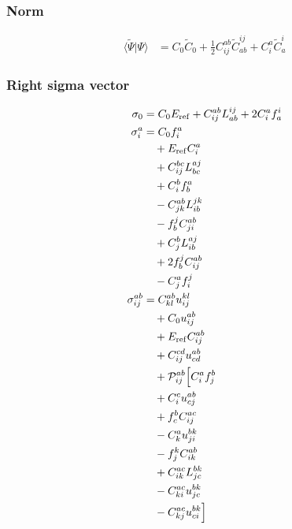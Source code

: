 
\subsubsection{Norm}
\begin{align*}
\langle\widetilde{\Psi}\vert\Psi\rangle &= C_{0} \widetilde{C}_{0}   + \frac{1}{2} C^{ab}_{ij}  \widetilde{C}^{ij}_{ab}   + C^{a}_{i}  \widetilde{C}^{i}_{a}
\end{align*}

\subsubsection{Right sigma vector}
\begin{align*}
\sigma_{0} &= C_{0} E_{\mathrm{ref}}   + C^{ab}_{ij}  L^{ij}_{ab}   + 2 C^{a}_{i}  f^{i}_{a} \\
\sigma^{a}_{i} &= C_{0} f^{a}_{i}  \\
  &\quad  + E_{\mathrm{ref}} C^{a}_{i}  \\
  &\quad  + C^{bc}_{ij}  L^{aj}_{bc}  \\
  &\quad  + C^{b}_{i}  f^{a}_{b}  \\
  &\quad - C^{ab}_{jk}  L^{jk}_{ib}  \\
  &\quad - f^{j}_{b}  C^{ab}_{ji}  \\
  &\quad  + C^{b}_{j}  L^{aj}_{ib}  \\
  &\quad  + 2 f^{j}_{b}  C^{ab}_{ij}  \\
  &\quad - C^{a}_{j}  f^{j}_{i} \\
\sigma^{ab}_{ij} &= C^{ab}_{kl}  u^{kl}_{ij}  \\
  &\quad  + C_{0} u^{ab}_{ij}  \\
  &\quad  + E_{\mathrm{ref}} C^{ab}_{ij}  \\
  &\quad  + C^{cd}_{ij}  u^{ab}_{cd} \\
  &\quad + \mathcal{P}^{ab}_{ij}\Bigl[ C^{a}_{i}  f^{b}_{j}  \\
  &\quad  + C^{c}_{i}  u^{ab}_{cj}  \\
  &\quad  + f^{b}_{c}  C^{ac}_{ij}  \\
  &\quad - C^{a}_{k}  u^{bk}_{ji}  \\
  &\quad - f^{k}_{j}  C^{ab}_{ik}  \\
  &\quad  + C^{ac}_{ik}  L^{bk}_{jc}  \\
  &\quad - C^{ac}_{ki}  u^{bk}_{jc}  \\
  &\quad - C^{ac}_{kj}  u^{bk}_{ci} \Bigr]
\end{align*}

